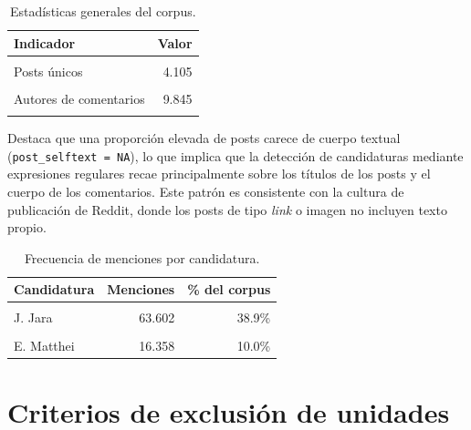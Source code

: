 \documentclass[
  letterpaper,
  numbers=noendperiod,
  fontsize=11pt,
  DIV=12,
  titlepage=false]{scrreprt}
\begin{document}
\begin{longtable}[t]{lr}

\caption{\label{tbl-general}Estadísticas generales del corpus.}

\tabularnewline

\toprule
Indicador & Valor\\
\midrule
\cellcolor{gray!10}{Comentarios totales} & \cellcolor{gray!10}{163.695}\\
Posts únicos & 4.105\\
\cellcolor{gray!10}{Autores de posts} & \cellcolor{gray!10}{1.106}\\
Autores de comentarios & 9.845\\
\cellcolor{gray!10}{Posts sin cuerpo textual (solo título)} & \cellcolor{gray!10}{99.434 (60.7\%)}\\
\bottomrule

\end{longtable}

Destaca que una proporción elevada de posts carece de cuerpo textual
(\texttt{post\_selftext\ =\ NA}), lo que implica que la detección de
candidaturas mediante expresiones regulares recae principalmente sobre
los títulos de los posts y el cuerpo de los comentarios. Este patrón es
consistente con la cultura de publicación de Reddit, donde los posts de
tipo \emph{link} o imagen no incluyen texto propio.

\begin{longtable}[t]{lrr}

\caption{\label{tbl-menciones}Frecuencia de menciones por candidatura.}

\tabularnewline

\toprule
Candidatura & Menciones & \% del corpus\\
\midrule
\cellcolor{gray!10}{José A. Kast} & \cellcolor{gray!10}{102.759} & \cellcolor{gray!10}{62.8\%}\\
J. Jara & 63.602 & 38.9\%\\
\cellcolor{gray!10}{J. Kaiser} & \cellcolor{gray!10}{26.521} & \cellcolor{gray!10}{16.2\%}\\
E. Matthei & 16.358 & 10.0\%\\
\bottomrule

\end{longtable}

\section{Criterios de exclusión de
unidades}\label{criterios-de-exclusiuxf3n-de-unidades}
\end{document}
